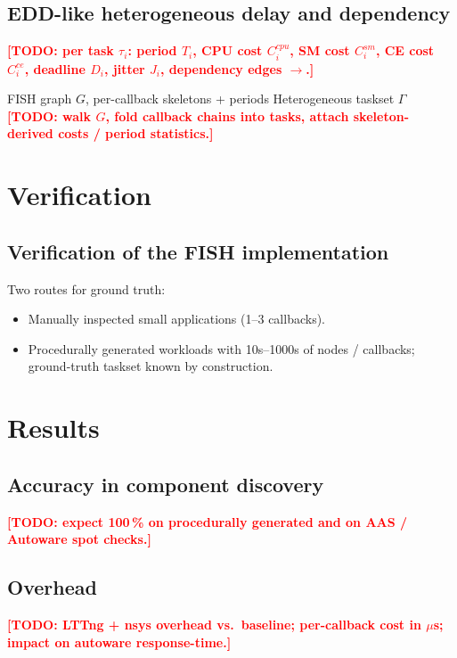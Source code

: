 \documentclass[conference]{IEEEtran}
\newcommand{\todoit}[1]{\textcolor{red}{\textbf{[TODO: #1]}}}
\begin{document}
\subsection{EDD-like heterogeneous delay and dependency}
\todoit{per task $\tau_i$: period $T_i$, CPU cost $C^{cpu}_i$,
SM cost $C^{sm}_i$, CE cost $C^{ce}_i$, deadline $D_i$, jitter
$J_i$, dependency edges $\rightarrow$.}

\begin{algorithm}[ht]
\caption{FISH to (modified) EDD}
\label{alg:fish-edd}
\begin{algorithmic}[1]
\Require FISH graph $G$, per-callback skeletons + periods
\Ensure Heterogeneous taskset $\Gamma$
\todoit{walk $G$, fold callback chains into tasks, attach skeleton-
derived costs / period statistics.}
\end{algorithmic}
\end{algorithm}

\section{Verification}

\subsection{Verification of the FISH implementation}
Two routes for ground truth:
\begin{itemize}
  \item Manually inspected small applications (1--3 callbacks).
  \item Procedurally generated workloads with 10s--1000s of nodes /
        callbacks; ground-truth taskset known by construction.
\end{itemize}

\section{Results}

\subsection{Accuracy in component discovery}
\todoit{expect 100\,\% on procedurally generated and on AAS / Autoware
spot checks.}

\subsection{Overhead}
\todoit{LTTng + nsys overhead vs.\ baseline; per-callback cost in
$\mu$s; impact on autoware response-time.}
\end{document}
